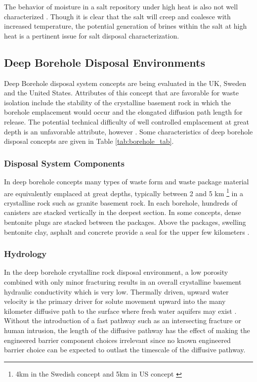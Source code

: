 The behavior of moisture in a salt repository under high heat is also not well 
characterized . Though it is clear that the salt will creep and coalesce with 
increased temperature, the potential generation of brines within the salt at 
high heat is a pertinent issue for salt disposal characterization. 



\subsection{Deep Borehole Disposal Environments}

Deep Borehole disposal system concepts are being evaluated in the UK, 
Sweden and the United States. Attributes of this concept that are 
favorable for waste isolation include the stability of the crystalline 
basement rock in which the borehole emplacement would occur and the elongated
diffusion path length for release. The potential technical difficulty of well 
controlled emplacement at great depth is an unfavorable attribute, however 
\cite{hardin_generic_2011}.  Some characteristics of deep borehole disposal 
concepts are given in Table \ref{tab:borehole_tab}.   



\subsubsection{Disposal System Components}

In deep borehole concepts many types of  waste form and waste package material 
are equivalently emplaced at great depths, typically between 2 and 5 km \footnote{4km in the Swedish concept 
and 5km in \gls{US} concept \cite{hardin_generic_2011, clayton_generic_2011} }
in a crystalline rock such as granite basement rock. In each borehole, hundreds
of canisters are stacked vertically in the deepest section. In some concepts, 
dense bentonite plugs are stacked between the packages. Above the packages, 
swelling bentonite clay, asphalt and concrete provide a seal for the upper few 
kilometers \cite{clayton_generic_2011}. 

\subsubsection{Hydrology}

In the deep borehole crystalline rock disposal environment, a low porosity
combined with only minor fracturing results in an overall crystalline basement
hydraulic conductivity which is very low. Thermally driven, upward water 
velocity is the primary driver for solute movement upward into the many 
kilometer diffusive path to the surface where fresh water aquifers may exist
\cite{clayton_generic_2011}.
Without the introduction of a fast pathway such as an intersecting fracture or 
human intrusion, the length of the diffusive pathway has the effect of making the 
engineered barrier component choices irrelevant since no known engineered 
barrier choice can be expected to outlast the timescale of the diffusive pathway.

